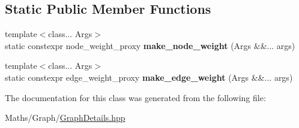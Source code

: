 \subsection*{Static Public Member Functions}
\begin{DoxyCompactItemize}
\item 
\mbox{\label{classsequoia_1_1maths_1_1graph__impl_1_1weight__maker_3_01_node_weight_pooling_00_01_edge_weightd42e71208bc15661adf908c6dce03949_a118d9cfb1c28c61e434e89f49be011e0}} 
{\footnotesize template$<$class... Args$>$ }\\static constexpr node\+\_\+weight\+\_\+proxy {\bfseries make\+\_\+node\+\_\+weight} (Args \&\&... args)
\item 
\mbox{\label{classsequoia_1_1maths_1_1graph__impl_1_1weight__maker_3_01_node_weight_pooling_00_01_edge_weightd42e71208bc15661adf908c6dce03949_a7401d3c0d6e9626f5afdf7502ff934d3}} 
{\footnotesize template$<$class... Args$>$ }\\static constexpr edge\+\_\+weight\+\_\+proxy {\bfseries make\+\_\+edge\+\_\+weight} (Args \&\&... args)
\end{DoxyCompactItemize}


The documentation for this class was generated from the following file\+:\begin{DoxyCompactItemize}
\item 
Maths/\+Graph/\mbox{\hyperlink{_graph_details_8hpp}{Graph\+Details.\+hpp}}\end{DoxyCompactItemize}
